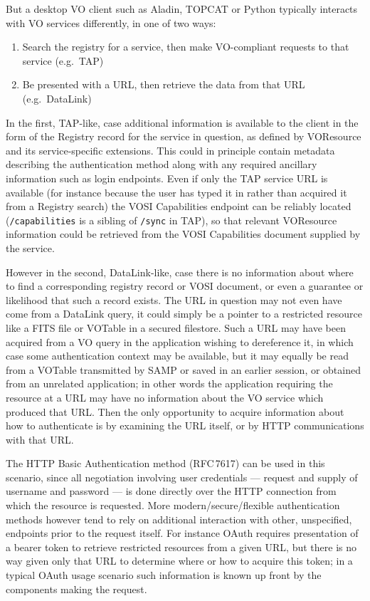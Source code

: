 \documentclass[11pt,a4paper]{ivoa}
\newcommand{\rfc}[1]{RFC\,#1}
\begin{document}
But a desktop VO client such as Aladin, TOPCAT or Python
typically interacts with VO services differently, in one of two
ways:
\begin{enumerate}
\item Search the registry for a service, then make VO-compliant
      requests to that service (e.g.\ TAP)
\item Be presented with a URL, then retrieve the data from that URL
      (e.g.\ DataLink)
\end{enumerate}
In the first, TAP-like, case additional information is available to the
client in the form of the Registry record for the service in question,
as defined by VOResource and its service-specific extensions.
This could in principle contain metadata describing the authentication
method along with any required ancillary information such as
login endpoints.
Even if only the TAP service URL is available
(for instance because the user has typed it in rather than acquired it
from a Registry search) the VOSI Capabilities endpoint can be reliably
located ({\tt /capabilities} is a sibling of {\tt /sync} in TAP),
so that relevant VOResource information could be retrieved from the VOSI
Capabilities document supplied by the service.

However in the second, DataLink-like, case
there is no information about where to find a corresponding
registry record or VOSI document,
or even a guarantee or likelihood that such a record exists.
The URL in question may not even have come from a DataLink query,
it could simply be a pointer to a restricted resource like a
FITS file or VOTable in a secured filestore.
Such a URL may have been acquired from a VO query in the application
wishing to dereference it, in which case some authentication context
may be available,
but it may equally be read from a VOTable transmitted by SAMP
or saved in an earlier session, or obtained from an unrelated application;
in other words the application requiring the resource at a URL may
have no information about the VO service which produced that URL.
Then the only opportunity to acquire information about how to authenticate
is by examining the URL itself, or by HTTP communications with that URL.

The HTTP Basic Authentication method (\rfc{7617}) can be used in this scenario,
since all negotiation involving user credentials ---
request and supply of username and password ---
is done directly
over the HTTP connection from which the resource is requested.
More modern/secure/flexible authentication methods however tend to
rely on additional interaction with other, unspecified, endpoints
prior to the request itself.  For instance OAuth requires presentation
of a bearer token to retrieve restricted resources from a given URL,
but there is no way given only that URL to determine where or how
to acquire this token;
in a typical OAuth usage scenario such information is known up front
by the components making the request.
\end{document}
